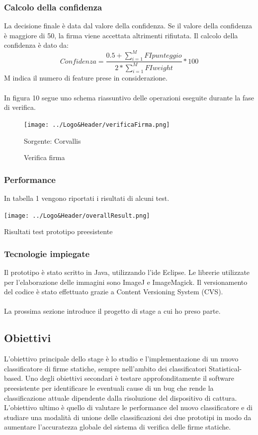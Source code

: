 \subsubsection*{Calcolo della confidenza}
\label{2.1.4.5}
La decisione finale è data dal valore della confidenza. Se il valore della confidenza è maggiore di 50, la firma viene accettata altrimenti rifiutata. Il calcolo della confidenza è dato da:
\[Confidenza = \frac{0.5+\sum\limits_{i=1}^M FIpunteggio}{2*\sum\limits_{i=1}^M FIweight} * 100\]
M indica il numero di feature prese in considerazione.\\\\
In figura 10 segue uno schema riassuntivo delle operazioni eseguite durante la fase di verifica.
\begin{figure}[H]
\centering
\texttt{[image: ../Logo\&Header/verificaFirma.png]}
\caption{Verifica firma}Sorgente: Corvallis
\end{figure}
\subsubsection*{Performance}
\label{2.1.4.6}
In tabella 1 vengono riportati i risultati di alcuni test.
\begin{table}[H]
  \label{tbl:excel-table}
  \centering
  \texttt{[image: ../Logo\&Header/overallResult.png]}
  \caption{Risultati test prototipo preesistente}
\end{table}
\subsubsection*{Tecnologie impiegate}
\label{2.1.4.7}
Il prototipo è stato scritto in Java, utilizzando l'ide Eclipse. Le librerie utilizzate per l'elaborazione delle immagini sono ImageJ e ImageMagick. Il versionamento del codice è stato effettuato grazie a Content Versioning System (CVS).\\\\
La prossima sezione introduce il progetto di stage a cui ho preso parte.
\subsection{Obiettivi}
\label{2.2}
L'obiettivo principale dello stage è lo studio e l'implementazione di un nuovo classificatore di firme statiche, sempre nell'ambito dei classificatori Statistical-based. Uno degli obiettivi secondari è testare approfonditamente il software preesistente per identificare le eventuali cause di un bug che rende la classificazione attuale dipendente dalla risoluzione del dispositivo di cattura. L'obiettivo ultimo è quello di valutare le performance del nuovo classificatore e di studiare una modalità di unione delle classificazioni dei due prototipi in modo da aumentare l'accuratezza globale del sistema di verifica delle firme statiche.
